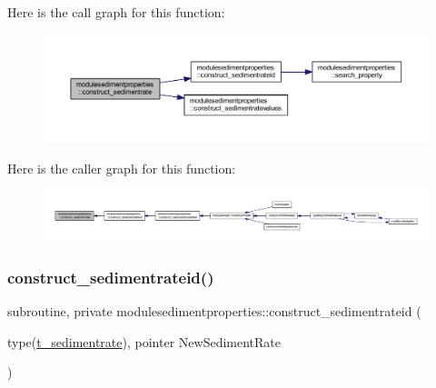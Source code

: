 Here is the call graph for this function\+:\nopagebreak
\begin{figure}[H]
\begin{center}
\leavevmode
\includegraphics[width=350pt]{namespacemodulesedimentproperties_a945018b7c1fcfbb5687c6021d5636530_cgraph}
\end{center}
\end{figure}
Here is the caller graph for this function\+:\nopagebreak
\begin{figure}[H]
\begin{center}
\leavevmode
\includegraphics[width=350pt]{namespacemodulesedimentproperties_a945018b7c1fcfbb5687c6021d5636530_icgraph}
\end{center}
\end{figure}
\mbox{\label{namespacemodulesedimentproperties_af77439b27c476526490c3dafac1f3411}} 
\subsubsection{\texorpdfstring{construct\+\_\+sedimentrateid()}{construct\_sedimentrateid()}}
{\footnotesize\ttfamily subroutine, private modulesedimentproperties\+::construct\+\_\+sedimentrateid (\begin{DoxyParamCaption}\item[{type(\mbox{\hyperlink{structmodulesedimentproperties_1_1t__sedimentrate}{t\+\_\+sedimentrate}}), pointer}]{New\+Sediment\+Rate }\end{DoxyParamCaption})\hspace{0.3cm}{\ttfamily [private]}}


